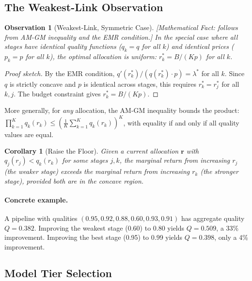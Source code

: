 \documentclass[11pt, a4paper]{googledeepmind}
\newtheorem{corollary}{Corollary}[section]
\newtheorem{observation}{Observation}[section]
\begin{document}
\subsection{The Weakest-Link Observation}

\begin{observation}[Weakest-Link, Symmetric Case]
\label{thm:econ-weakest-link}
\emph{[Mathematical Fact: follows from AM-GM inequality and the EMR condition.]}
In the special case where all stages have identical quality functions ($q_k = q$ for all $k$) and identical prices ($p_k = p$ for all $k$), the optimal allocation is uniform: $r_k^* = B / (Kp)$ for all $k$.
\end{observation}

\begin{proof}[Proof sketch]
By the EMR condition, $q'(r_k^*) / (q(r_k^*) \cdot p) = \lambda^*$ for all $k$. Since $q$ is strictly concave and $p$ is identical across stages, this requires $r_k^* = r_j^*$ for all $k, j$. The budget constraint gives $r_k^* = B/(Kp)$.
\end{proof}

More generally, for \emph{any} allocation, the AM-GM inequality bounds the product: $\prod_{k=1}^K q_k(r_k) \leq \left(\frac{1}{K} \sum_{k=1}^K q_k(r_k)\right)^K$, with equality if and only if all quality values are equal.

\begin{corollary}[Raise the Floor]
\label{cor:econ-raise-floor}
Given a current allocation $\mathbf{r}$ with $q_j(r_j) < q_k(r_k)$ for some stages $j, k$, the marginal return from increasing $r_j$ (the weaker stage) exceeds the marginal return from increasing $r_k$ (the stronger stage), provided both are in the concave region.
\end{corollary}

\paragraph{Concrete example.} A pipeline with qualities $(0.95, 0.92, 0.88, 0.60, 0.93, 0.91)$ has aggregate quality $Q = 0.382$. Improving the weakest stage (0.60) to 0.80 yields $Q = 0.509$, a 33\% improvement. Improving the best stage (0.95) to 0.99 yields $Q = 0.398$, only a 4\% improvement.

\subsection{Model Tier Selection}
\end{document}
